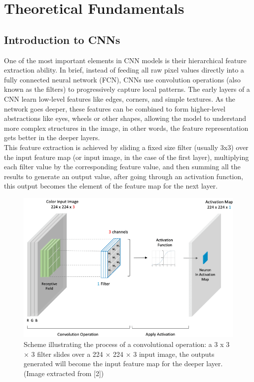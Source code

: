 \chapter{Theoretical Fundamentals}
\section{Introduction to CNNs}

One of the most important elements in CNN models is their hierarchical feature extraction ability. In brief, instead of feeding all raw pixel values directly into a fully connected neural network (FCN), CNNs use convolution operations (also known as the filters) to progressively capture local patterns. The early layers of a CNN learn low-level features like edges, corners, and simple textures. As the network goes deeper, these features can be combined to form higher-level abstractions like eyes, wheels or other shapes, allowing the model to understand more complex structures in the image, in other words, the feature representation gets better in the deeper layers. \\


This feature extraction is achieved by sliding a fixed size filter (usually 3x3) over the input feature map (or input image, in the case of the first layer), multiplying each filter value by the corresponding feature value, and then summing all the results to generate an output value, after going through an activation function, this output becomes the element of the feature map for the next layer. \\
\begin{figure}[H]
 \centering
 \includegraphics[scale=0.53]{IMAGENES/IMG2-Convolutional_operation.png}
 \captionsetup{font=large}
 \caption {Scheme illustrating the process of a convolutional operation: a 3 x 3 × 3 filter slides over a 224 × 224 × 3 input image, the outputs generated will become the input feature map for the deeper layer. (Image extracted from [2]) }
\end{figure}



